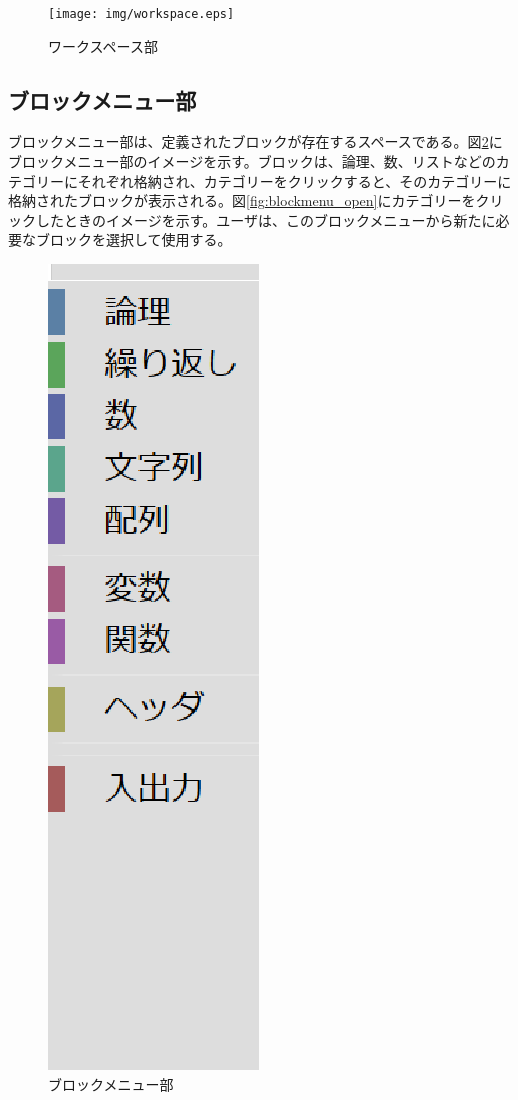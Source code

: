 \documentclass{eniepaper}
\begin{document}
\begin{figure}[h]
\begin{center}
\texttt{[image: img/workspace.eps]}
\caption{ワークスペース部}%
\label{fig:workspace}
\end{center}%
\end{figure}%

   \newpage

   \subsection{ブロックメニュー部}
   
ブロックメニュー部は、定義されたブロックが存在するスペースである。図\ref{fig:blockmenu}にブロックメニュー部のイメージを示す。ブロックは、論理、数、リストなどのカテゴリーにそれぞれ格納され、カテゴリーをクリックすると、そのカテゴリーに格納されたブロックが表示される。図\ref{fig:blockmenu_open}にカテゴリーをクリックしたときのイメージを示す。ユーザは、このブロックメニューから新たに必要なブロックを選択して使用する。

\begin{figure}[h]
\begin{center}
\includegraphics[scale=0.3]{img/blockmenu.eps}
\caption{ブロックメニュー部}%
\label{fig:blockmenu}
\end{center}%
\end{figure}%
\end{document}
